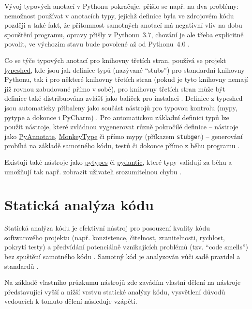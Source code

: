 Vývoj typových anotací v Pythonu pokračuje, přišlo se např. na dva problémy: nemožnost používat v anotacích typy, jejichž definice byla ve zdrojovém kódu později a také fakt, že přítomnost samotných anotací má negativní vliv na dobu spouštění programu, opravy přišly v Pythonu~3.7, chování je ale třeba explicitně povolit, ve výchozím stavu bude povolené až od Pythonu~4.0 \cite{python3.7}.

Co se týče typových anotací pro knihovny třetích stran, používá se projekt \href{https://github.com/python/typeshed}{typeshed}, kde jsou jak definice typů (nazývané \enquote{stubs}) pro standardní knihovny Pythonu, tak i pro některé knihovny třetích stran (pokud je tyto knihovny nemají již rovnou zabudované přímo v sobě), pro knihovny třetích stran může být definice také distribuována zvlášť jako balíček pro instalaci \cite{types-python-realpython, mypy-docs}. Definice z typeshed jsou automaticky přibaleny jako součást nástrojů pro typovou kontrolu (mypy, pytype a dokonce i PyCharm) \cite{typeshed}. Pro automatickou základní definici typů lze použít nástroje, které zvládnou vygenerovat různě pokročilé definice -- nástroje jako \href{https://github.com/dropbox/pyannotate}{PyAnnotate}, \href{https://github.com/Instagram/MonkeyType}{MonkeyType} či přímo mypy (příkazem \verb|stubgen|) -- generování probíhá na základě samotného kódu, testů či dokonce přímo z běhu programu \cite{types-python-bernat}.

Existují také nástroje jako \href{https://github.com/Stewori/pytypes}{pytypes} či \href{https://github.com/samuelcolvin/pydantic/}{pydantic}, které typy validují za běhu a umožňují tak např. zobrazit uživateli srozumitelnou chybu \cite{types-python-bernat, pydantic}. 


\section{Statická analýza kódu}\label{sec:statickaanalyzakodu}

Statická analýza kódu je efektivní nástroj pro posouzení kvality kódu softwarového projektu (např. konzistence, čitelnost, zranitelnosti, rychlost, pokrytí testy) a předvídání potenciálně vznikajících problémů (tzv. \enquote{code smells}) bez spuštění samotného kódu \cite{medium-devgurus, static-overops}. Samotný kód je analyzován vůči sadě pravidel a standardů \cite{static-overops}.

Na základě vlastního průzkumu nástrojů zde zavádím vlastní dělení na nástroje představující vyšší a nižší vrstvu statické analýzy kódu, vysvětlení důvodů vedoucích k tomuto dělení následuje vzápětí.

